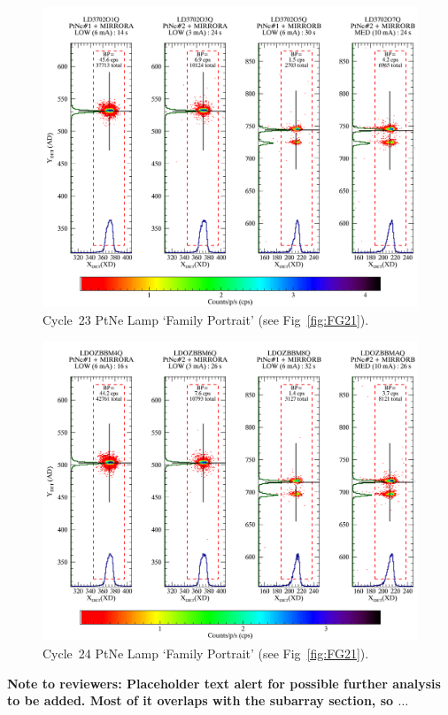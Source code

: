 \begin{figure}[htb]
\noindent\includegraphics*[width=0.9\linewidth]{png/C23_14440_FP.png}
\caption[C23 WCA Lamp `Family Portrait']{Cycle~23 PtNe Lamp `Family Portrait' (see Fig~\ref{fig:FG21}).\label{fig:FG23}}
\end{figure}

\begin{figure}[htb]
\noindent\includegraphics*[width=0.9\linewidth]{png/C24_14857_FP.png}
\caption[C24 WCA Lamp `Family Portrait']{Cycle~24 PtNe Lamp `Family Portrait' (see Fig~\ref{fig:FG21}).\label{fig:FG24}}
\end{figure}

{\bf Note to reviewers: Placeholder text alert for possible further analysis to be added. Most of it overlaps with the subarray section, so $\dots$}
